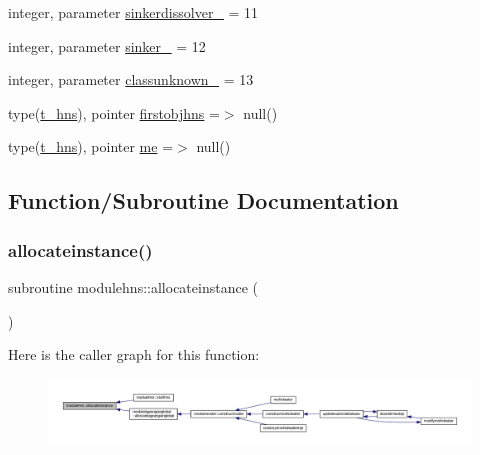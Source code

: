\begin{DoxyCompactItemize}
integer, parameter \mbox{\hyperlink{namespacemodulehns_aa0404cd5f1d8c21f47bd63bdc49da335}{sinkerdissolver\+\_\+}} = 11
\item 
integer, parameter \mbox{\hyperlink{namespacemodulehns_ae96b2e85a4537b419fe1a12258982859}{sinker\+\_\+}} = 12
\item 
integer, parameter \mbox{\hyperlink{namespacemodulehns_a358b7b669ccd8504299b7c44c39cad28}{classunknown\+\_\+}} = 13
\item 
type(\mbox{\hyperlink{structmodulehns_1_1t__hns}{t\+\_\+hns}}), pointer \mbox{\hyperlink{namespacemodulehns_a9a4e8bc013590ee0dbb507ba6c44064a}{firstobjhns}} =$>$ null()
\item 
type(\mbox{\hyperlink{structmodulehns_1_1t__hns}{t\+\_\+hns}}), pointer \mbox{\hyperlink{namespacemodulehns_a98081b0b751e146911fdbbdfc6bb2320}{me}} =$>$ null()
\end{DoxyCompactItemize}


\subsection{Function/\+Subroutine Documentation}
\mbox{\label{namespacemodulehns_a1ecdd29807e20a3d2a3ad0b9fc798f51}} 
\subsubsection{\texorpdfstring{allocateinstance()}{allocateinstance()}}
{\footnotesize\ttfamily subroutine modulehns\+::allocateinstance (\begin{DoxyParamCaption}{ }\end{DoxyParamCaption})\hspace{0.3cm}{\ttfamily [private]}}

Here is the caller graph for this function\+:\nopagebreak
\begin{figure}[H]
\begin{center}
\leavevmode
\includegraphics[width=350pt]{namespacemodulehns_a1ecdd29807e20a3d2a3ad0b9fc798f51_icgraph}
\end{center}
\end{figure}
\mbox{\label{namespacemodulehns_a3c016aeb7936c47cd4071d8b9aa3ac75}} 

